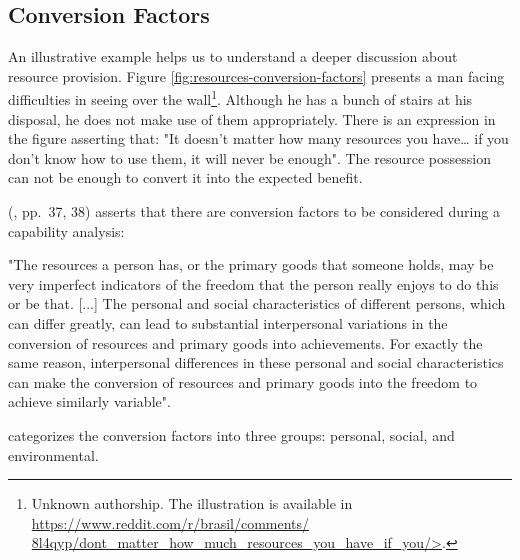 \subsection{Conversion Factors}
\label{sen-ss:conv-fac}

An illustrative example helps us to understand a deeper discussion about resource provision. Figure \ref{fig:resources-conversion-factors} presents a man facing difficulties in seeing over the wall\footnote{Unknown authorship. The illustration is available in \url{https://www.reddit.com/r/brasil/comments/ 8l4qyp/dont_matter_how_much_resources_you_have_if_you/>}.}. Although he has a bunch of stairs at his disposal, he does not make use of them appropriately. There is an expression in the figure asserting that: "It doesn't matter how many resources you have… if you don't know how to use them, it will never be enough". The resource possession can not be enough to convert it into the expected benefit. 

 (\citeyear{sen:1992}, pp.~37, 38) asserts that there are conversion factors to be considered during a capability analysis:
\begin{citacao}
    "The resources a person has, or the primary goods that someone holds, may be very imperfect indicators of the freedom that the person really enjoys to do this or be that. [...] The personal and social characteristics of different persons, which can differ greatly, can lead to substantial interpersonal variations in the conversion of resources and primary goods into achievements. For exactly the same reason, interpersonal differences in these personal and social characteristics can make the conversion of resources and primary goods into the freedom to achieve similarly variable".
\end{citacao}
 categorizes the conversion factors into three groups: personal, social, and environmental.

